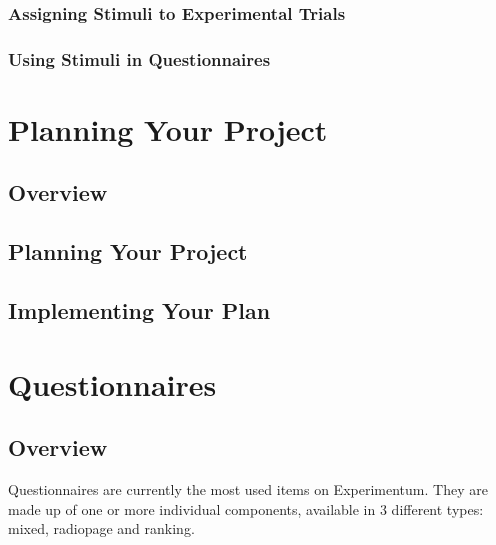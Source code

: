 \documentclass[]{book}
\begin{document}
\hypertarget{assigning-stimuli-to-experimental-trials}{%
\subsection{Assigning Stimuli to Experimental Trials}\label{assigning-stimuli-to-experimental-trials}}

\hypertarget{using-stimuli-in-questionnaires}{%
\subsection{Using Stimuli in Questionnaires}\label{using-stimuli-in-questionnaires}}

\hypertarget{planning-your-project}{%
\chapter{Planning Your Project}\label{planning-your-project}}

\hypertarget{overview-2}{%
\section{Overview}\label{overview-2}}

\hypertarget{planning-your-project-1}{%
\section{Planning Your Project}\label{planning-your-project-1}}

\hypertarget{implementing-your-plan}{%
\section{Implementing Your Plan}\label{implementing-your-plan}}

\hypertarget{questionnaires}{%
\chapter{Questionnaires}\label{questionnaires}}

\hypertarget{overview-3}{%
\section{Overview}\label{overview-3}}

Questionnaires are currently the most used items on Experimentum. They are made up of one or more individual components, available in 3 different types: mixed, radiopage and ranking.
\end{document}
